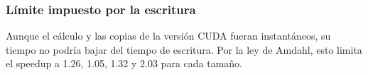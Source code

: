 \subsubsection*{Límite impuesto por la escritura}

Aunque el cálculo y las copias de la versión CUDA fueran instantáneos, su tiempo no podría bajar del tiempo de escritura. Por la ley de Amdahl, esto limita el speedup a 1.26, 1.05, 1.32 y 2.03 para cada tamaño.